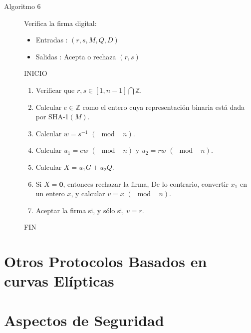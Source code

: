 \documentclass[11pt]{article}
\newcommand{\Z}{\mathbb{Z}}
\numberwithin{equation}{section} %
\numberwithin{figure}{section} %
\numberwithin{table}{section} %
\begin{document}
\begin{description}
			\item[Algoritmo 6] Verifica la firma digital:%
			\begin{itemize}
				\item Entradas : $(r,s,M,Q,D)$
				\item Salidas : Acepta o rechaza $(r,s)$
			\end{itemize}
			INICIO
			\begin{enumerate}
				\item Verificar que $r,s\in [1,n-1]\bigcap\Z$.
				\item Calcular $e\in \Z$ como el entero cuya representación binaria está dada por SHA-1$(M)$.
				\item Calcular $w=s^{-1}$ $(\mod \text{ } n)$.
				\item Calcular $u_1=ew$ $(\mod\text{ }n)$ y $u_2=rw$ $(\mod\text{ }n)$.
				\item Calcular $X=u_1G+u_2Q$.
				\item Si $X=\mathbf{0}$, entonces rechazar la firma, De lo contrario, convertir $x_1$ en un entero $x$, y calcular $v=x$ $(\mod\text{ }n)$.
				\item Aceptar la firma si, y sólo si, $v=r$.
			\end{enumerate}
			FIN

\end{description}%

\section{Otros Protocolos Basados en curvas Elípticas}



\section{Aspectos de Seguridad}
\end{document}
